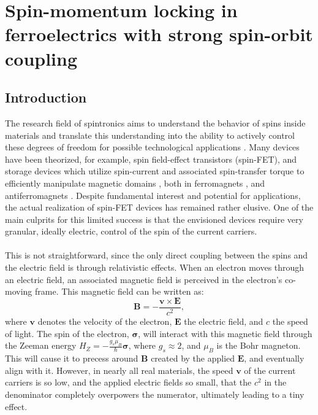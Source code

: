 \newcommand{\Unkr}{u_n(\bm{k}, \bm{r})}
\newcommand{\Eikr}{e^{i\bm{k}\cdot\bm{r}}}
\chapter{Spin-momentum locking in ferroelectrics with strong spin-orbit coupling\label{ch:Rashba}}
\section{Introduction}
The research field of spintronics aims to understand the behavior of spins inside materials and translate this understanding into the ability to actively control these degrees of freedom for possible technological applications \cite{Joshi2016}.
Many devices have been theorized, for example, spin field-effect transistors (spin-FET)\cite{Datta1990}, and storage devices  which utilize spin-current and associated spin-transfer torque to efficiently manipulate magnetic domains \cite{Kent2015}, both in ferromagnets \cite{Nunez2011}, and antiferromagnets \cite{Nunez2006TheorySemiconductors,Nunez2006TheoryMetals, Jungwirth2016}.
Despite fundamental interest and potential for applications, the actual realization of spin-FET devices has remained rather elusive.
One of the main culprits for this limited success is that the envisioned devices require very granular, ideally electric, control of the spin of the current carriers.
\\\\
This is not straightforward, since the only direct coupling between the spins and the electric field is through relativistic effects. When an electron moves through an electric field, an associated magnetic field is perceived in the electron's co-moving frame. This magnetic field can be written as:
\begin{equation}
	\label{eq:Rashba_B}
	\bm{B} = - \frac{\bm v \times \bm E}{c^2},
\end{equation}
where $\bm v$ denotes the velocity of the electron, $\bm E$ the electric field, and $c$ the speed of light.
The spin of the electron, $\bm{\sigma}$, will interact with this magnetic field through the Zeeman energy $H_Z = -\frac{g_s\mu_B}{\hbar} \bm{\sigma}$, where $g_s \approx 2$, and $\mu_B$ is the Bohr magneton.
This will cause it to precess around $\bm B$ created by the applied $\bm E$, and eventually align with it.
However, in nearly all real materials, the speed $\bm v$ of the current carriers is so low, and the applied electric fields so small, that the $c^2$ in the denominator completely overpowers the numerator, ultimately leading to a tiny effect.
